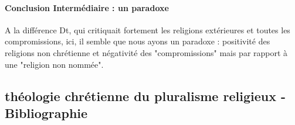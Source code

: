  

\begin{comment}
\begin{singlequote}
    les fonctionnalistes préfèrent définir la "religion", non pas en termes de \textit{ce que} croient les hommes religieux, mais en termes de la \textit{manière dont} ils croient (c'est-à-dire en fonction du rôle que la croyance joue dans la vie des gens". Clrke / byrne 1993
\end{singlequote}
    à la suite de Durkheim.

    voir règne de Dieu
 

  si sécularisation : nouvel idolatrie, on comprend l'ouverture aux autre religions. 

 
    lire Joseph Komochak : Chenu  inclinaison aristotelicienne et thomiste à l'autonomie vs Ratzinger Augustin séparation de nature et Grace. La valuatazioni sulla Gaudium et spes : Cheni, Dossetti and Ratzinger". in Joseph Doré et Alberto Melloni : volti di fine concilio. 2000

    Alors que le père Chenu voyait une chance dans le processus de sécularisation et dans l'autonomisation d'un nombre grandissant d'actions de l'homme, Claude Geffré était déjà plus critique  tout en reconnaissant le caractère positif de la désacralisation, inscrit au coeur même de la religion judéo-chrétienne. Annoncer la Parole de Dieu à un homme qui a conquis son autonomie et qui a démystifié un certain nombre d'aliénations, permet pour Geffré de lui donner le sens qui est absent désormais du monde sécularisé.

\end{comment}
 



\paragraph{Conclusion Intermédiaire : un paradoxe} 
A la différence Dt, qui critiquait fortement les religions extérieures et toutes les compromissions, ici, il semble que nous ayons un paradoxe : positivité des religions non chrétienne et négativité des "compromissions" mais par rapport à une "religion non nommée".

\subsection{théologie chrétienne du pluralisme religieux - Bibliographie}
